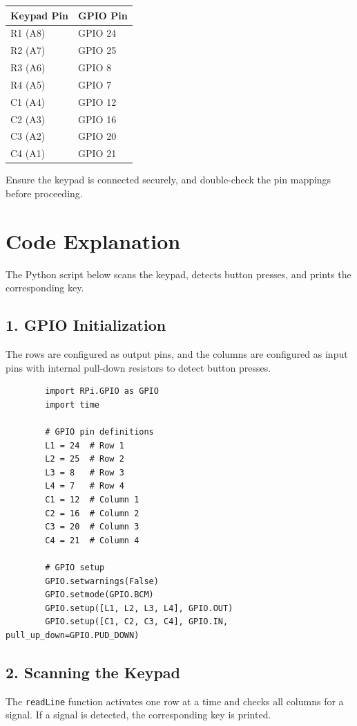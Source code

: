 \documentclass{article}
\begin{document}
	\begin{center}
		\begin{tabular}{|l|l|}
			\hline
			\textbf{Keypad Pin} & \textbf{GPIO Pin} \\
			\hline
			R1 (A8)    & GPIO 24  \\
			R2 (A7)    & GPIO 25  \\
			R3 (A6)    & GPIO 8   \\
			R4 (A5)    & GPIO 7   \\
			C1 (A4)    & GPIO 12  \\
			C2 (A3)    & GPIO 16  \\
			C3 (A2)    & GPIO 20  \\
			C4 (A1)    & GPIO 21  \\
			\hline
		\end{tabular}
	\end{center}
	
	Ensure the keypad is connected securely, and double-check the pin mappings before proceeding.
	
	\section*{Code Explanation}
	
	The Python script below scans the keypad, detects button presses, and prints the corresponding key.
	
	\subsection*{1. GPIO Initialization}
	The rows are configured as output pins, and the columns are configured as input pins with internal pull-down resistors to detect button presses.
	
	\begin{lstlisting}
		import RPi.GPIO as GPIO
		import time
		
		# GPIO pin definitions
		L1 = 24  # Row 1
		L2 = 25  # Row 2
		L3 = 8   # Row 3
		L4 = 7   # Row 4
		C1 = 12  # Column 1
		C2 = 16  # Column 2
		C3 = 20  # Column 3
		C4 = 21  # Column 4
		
		# GPIO setup
		GPIO.setwarnings(False)
		GPIO.setmode(GPIO.BCM)
		GPIO.setup([L1, L2, L3, L4], GPIO.OUT)
		GPIO.setup([C1, C2, C3, C4], GPIO.IN, pull_up_down=GPIO.PUD_DOWN)
	\end{lstlisting}
	
	\subsection*{2. Scanning the Keypad}
	The \texttt{readLine} function activates one row at a time and checks all columns for a signal. If a signal is detected, the corresponding key is printed.
	
\end{document}
